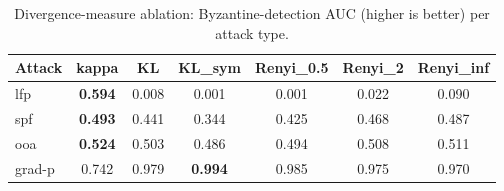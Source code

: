 \begin{table}[t]\centering\small
\caption{Divergence-measure ablation: Byzantine-detection AUC (higher is better) per attack type.}
\label{tab:divergence_ablation}
\begin{tabular}{lcccccc}
\toprule
Attack & kappa & KL & KL\_sym & Renyi\_0.5 & Renyi\_2 & Renyi\_inf \\
\midrule
lfp & \textbf{0.594} & 0.008 & 0.001 & 0.001 & 0.022 & 0.090 \\
spf & \textbf{0.493} & 0.441 & 0.344 & 0.425 & 0.468 & 0.487 \\
ooa & \textbf{0.524} & 0.503 & 0.486 & 0.494 & 0.508 & 0.511 \\
grad-p & 0.742 & 0.979 & \textbf{0.994} & 0.985 & 0.975 & 0.970 \\
\bottomrule
\end{tabular}
\end{table}
